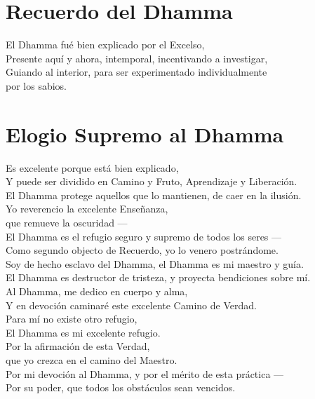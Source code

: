 \clearpage

\chapter{Recuerdo del Dhamma}

\begin{leader}
\end{leader}


El Dhamma fué bien explicado por el Excelso,\\
Presente aquí y ahora, intemporal, incentivando a investigar,\\
Guiando al interior, para ser experimentado individualmente\\
\vin por los sabios.


\nextChapterUseDelegatedPageNumber

\chapter{Elogio Supremo al Dhamma}

\begin{leader}
\end{leader}

\enlargethispage{\baselineskip}

Es excelente porque está bien explicado,\\
Y puede ser dividido en Camino y Fruto, Aprendizaje y Liberación.\\
El Dhamma protege aquellos que lo mantienen, de caer en la ilusión.\\
Yo reverencio la excelente Enseñanza,\\
\vin que remueve la oscuridad ---\\
El Dhamma es el refugio seguro y supremo de todos los seres ---\\
Como segundo objecto de Recuerdo, yo lo venero postrándome.\\
Soy de hecho esclavo del Dhamma, el Dhamma es mi maestro y guía.\\
El Dhamma es destructor de tristeza, y proyecta bendiciones sobre mí.\\
Al Dhamma, me dedico en cuerpo y alma,\\
Y en devoción caminaré este excelente Camino de Verdad.\\
Para mí no existe otro refugio,\\
\vin El Dhamma es mi excelente refugio.\\
Por la afirmación de esta Verdad,\\
\vin que yo crezca en el camino del Maestro.\\
Por mi devoción al Dhamma, y por el mérito de esta práctica ---\\
Por su poder, que todos los obstáculos sean vencidos.

